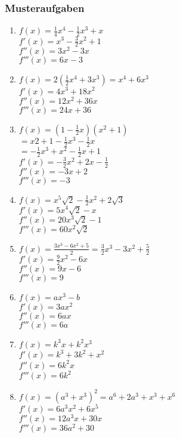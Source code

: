 \subsubsection{Musteraufgaben}
\begin{multicols}{2}
\begin{enumerate}
    \item $f(x) = \frac{1}{4}x^4-\frac{1}{2}x^3+x$\\
    $f'(x) = x^3-\frac{3}{2}x^2+1$\\
    $f''(x) = 3x^2-3x$\\
    $f'''(x) = 6x-3$
    \item $f(x) = 2(\frac{1}{2}x^4+3x^3) = x^4+6x^3$\\
    $f'(x) = 4x^3+18x^2$\\
    $f''(x) = 12x^2+36x $\\
    $f'''(x) = 24x+36 $
    \item $f(x) = (1-\frac{1}{2}x)(x^2+1)$\\
    $= x2+1-\frac{1}{2}x^3-\frac{1}{2}x$\\
    $= -\frac{1}{2}x^3+x^2-\frac{1}{2}x+1$\\
    $f'(x) = -\frac{3}{2}x^2+2x-\frac{1}{2}$\\
    $f''(x) = -3x+2$\\
    $f'''(x) = -3$
    \item $f(x) = x^5\sqrt{2}-\frac{1}{2}x^2+2\sqrt{3}$\\
    $f'(x) = 5x^4\sqrt{2}-x$\\
    $f''(x) = 20x^3\sqrt{2}-1$\\
    $f'''(x) = 60x^2\sqrt{2}$
    \item $f(x) = \frac{3x^3-6x^2+5}{2} = \frac{3}{2}x^3-3x^2+\frac{5}{2}$\\
    $f'(x) = \frac{9}{2}x^2-6x$\\
    $f''(x) = 9x-6$\\
    $f'''(x) = 9$
    \item $f(x) = ax^3-b$\\
    $f'(x) = 3ax^2$\\
    $f''(x) = 6ax$\\
    $f'''(x) = 6a$
    \item $f(x) = k^3x+k^2x^3$\\
    $f'(x) = k^3+3k^2+x^2$\\
    $f''(x) = 6k^2x$\\
    $f'''(x) = 6k^2$
    \item $f(x) = (a^3+x^3)^2 = a^6+2a^3+x^3+x^6$\\
    $f'(x) = 6a^3x^2+6x^5$\\
    $f''(x) = 12a^3x+30x$\\
    $f'''(x) = 36a^2+30$
\end{enumerate}
\end{multicols}

